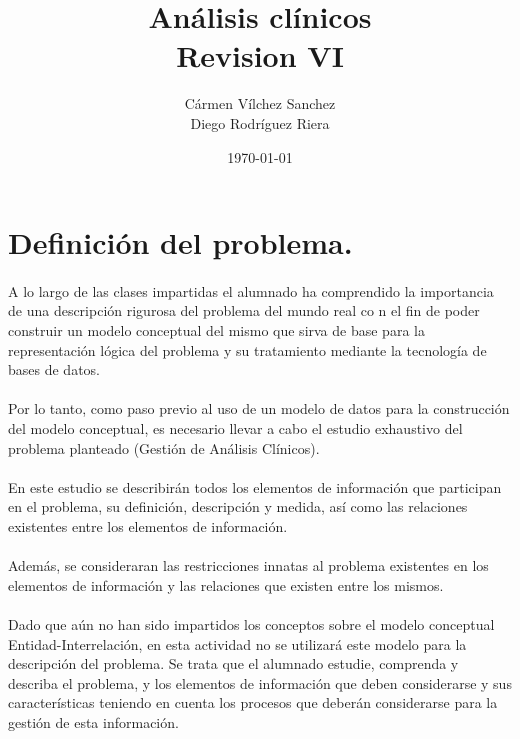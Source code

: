 \documentclass[a4paper,10pt]{article}
\title{Análisis clínicos\\{\small Revision VI}}
\author{Cármen Vílchez Sanchez\\Diego Rodríguez Riera}
\date{\today}
\begin{document}
\maketitle
\pagebreak
\tableofcontents
\pagebreak

\section{Definición del problema.}
\paragraph{}
A lo largo de las clases impartidas el alumnado ha comprendido la importancia de una descripción rigurosa del problema del mundo real co n el fin de poder construir un modelo conceptual del mismo que sirva de base para la representación lógica del problema y su tratamiento mediante la tecnología de bases de datos.
\paragraph{}
Por lo tanto, como paso previo al uso de un modelo de datos para la construcción del modelo conceptual, es necesario llevar a cabo el estudio exhaustivo del problema planteado (Gestión de Análisis Clínicos).
\paragraph{}
En este estudio se describirán todos los elementos de información que participan en el problema, su definición, descripción y medida, así como las relaciones existentes entre los elementos de información.
\paragraph{}
Además, se consideraran las restricciones innatas al problema existentes en los elementos de información y las relaciones que existen entre los mismos.
\paragraph{}
Dado que aún no han sido impartidos los conceptos sobre el modelo conceptual Entidad-Interrelación, en esta actividad no se utilizará este modelo para la descripción del problema. Se trata que el alumnado estudie, comprenda y describa el problema, y los elementos de información que deben considerarse y sus características teniendo en cuenta los procesos que deberán considerarse para la gestión de esta información.
\pagebreak
\end{document}
